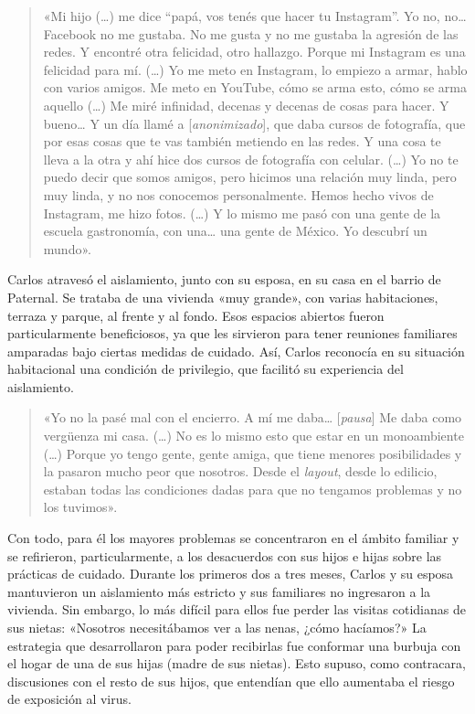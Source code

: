 \begin{quote}
«Mi hijo (\ldots) me dice ``papá, vos tenés que hacer tu Instagram''. Yo no, no\ldots{} Facebook no me gustaba. No me gusta y no me gustaba la agresión de las redes. Y encontré otra felicidad, otro hallazgo. Porque mi Instagram es una felicidad para mí. (\ldots) Yo me meto en Instagram, lo empiezo a armar, hablo con varios amigos. Me meto en YouTube, cómo se arma esto, cómo se arma aquello (\ldots) Me miré infinidad, decenas y decenas de cosas para hacer. Y bueno\ldots{} Y un día llamé a {[}\emph{anonimizado}{]}, que daba cursos de fotografía, que por esas cosas que te vas también metiendo en las redes. Y una cosa te lleva a la otra y ahí hice dos cursos de fotografía con celular. (\ldots) Yo no te puedo decir que somos amigos, pero hicimos una relación muy linda, pero muy linda, y no nos conocemos personalmente. Hemos hecho vivos de Instagram, me hizo fotos. (\ldots) Y lo mismo me pasó con una gente de la escuela gastronomía, con una\ldots{} una gente de México. Yo descubrí un mundo».
\end{quote}

Carlos atravesó el aislamiento, junto con su esposa, en su casa en el barrio de Paternal. Se trataba de una vivienda «muy grande», con varias habitaciones, terraza y parque, al frente y al fondo. Esos espacios abiertos fueron particularmente beneficiosos, ya que les sirvieron para tener reuniones familiares amparadas bajo ciertas medidas de cuidado. Así, Carlos reconocía en su situación habitacional una condición de privilegio, que facilitó su experiencia del aislamiento.

\begin{quote}
«Yo no la pasé mal con el encierro. A mí me daba\ldots{} {[}\emph{pausa}{]} Me daba como vergüenza mi casa. (\ldots) No es lo mismo esto que estar en un monoambiente (\ldots) Porque yo tengo gente, gente amiga, que tiene menores posibilidades y la pasaron mucho peor que nosotros. Desde el \emph{layout}, desde lo edilicio, estaban todas las condiciones dadas para que no tengamos problemas y no los tuvimos».
\end{quote}

Con todo, para él los mayores problemas se concentraron en el ámbito familiar y se refirieron, particularmente, a los desacuerdos con sus hijos e hijas sobre las prácticas de cuidado. Durante los primeros dos a tres meses, Carlos y su esposa mantuvieron un aislamiento más estricto y sus familiares no ingresaron a la vivienda. Sin embargo, lo más difícil para ellos fue perder las visitas cotidianas de sus nietas: «Nosotros necesitábamos ver a las nenas, ¿cómo hacíamos?» La estrategia que desarrollaron para poder recibirlas fue conformar una burbuja con el hogar de una de sus hijas (madre de sus nietas). Esto supuso, como contracara, discusiones con el resto de sus hijos, que entendían que ello aumentaba el riesgo de exposición al virus.

